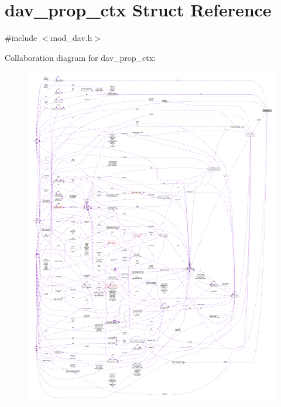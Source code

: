 \hypertarget{structdav__prop__ctx}{}\section{dav\+\_\+prop\+\_\+ctx Struct Reference}
\label{structdav__prop__ctx}


{\ttfamily \#include $<$mod\+\_\+dav.\+h$>$}



Collaboration diagram for dav\+\_\+prop\+\_\+ctx\+:
\nopagebreak
\begin{figure}[H]
\begin{center}
\leavevmode
\includegraphics[width=350pt]{structdav__prop__ctx__coll__graph}
\end{center}
\end{figure}
